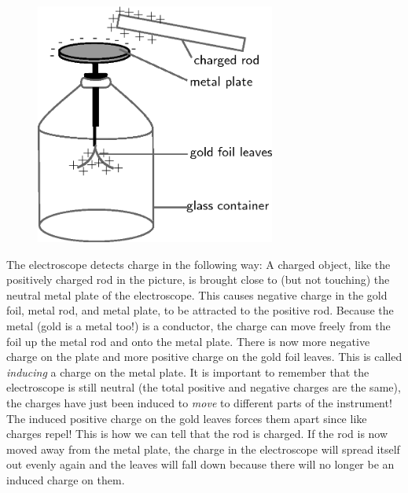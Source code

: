 	\begin{figure}[H] %
    \begin{center}
    \label{m38781*id200546!!!underscore!!!media}\label{m38781*id200546!!!underscore!!!printimage}\includegraphics[height=300px]{col11305.imgs/m38781_PG10C8_009.png} %
        
      \vspace{2pt}
    \vspace{.1in}
    
    \end{center}

 \end{figure}   

    \addtocounter{footnote}{-0}
    
        \par 
        \label{m38781*id200552}The electroscope detects charge in the following way: A charged object, like the positively charged rod in the picture, is brought close to (but not touching) the neutral metal plate of the electroscope. This causes negative charge in the gold foil, metal rod, and metal plate, to be attracted to the positive rod. Because the metal (gold is a metal too!) is a conductor, the charge can move freely from the foil up the metal rod and onto the metal plate. There is now more negative charge on the plate and more positive charge on the gold foil leaves. This is called \textsl{inducing} a charge on the metal plate. It is important to remember that the electroscope is still neutral (the total positive and negative charges are the same), the charges have just been induced to \textsl{move} to different parts of the instrument! The induced positive charge on the gold leaves forces them apart since like charges repel! This is how we can tell that the rod is charged. If the rod is now moved away from the metal plate, the charge in the electroscope will spread itself out evenly again and the leaves will fall down because there will no longer be an induced charge on them.\par 
        \label{m38781*uid12}
